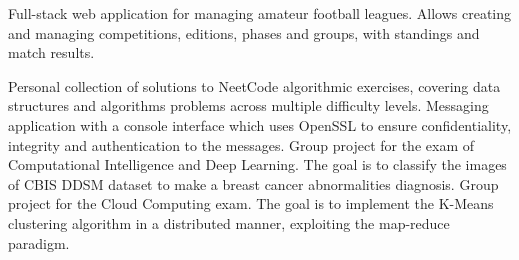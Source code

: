 
  {Full-stack web application for managing amateur football leagues. Allows creating and managing competitions, editions, phases and groups, with standings and match results.}
  {}
  {    }
\vspace{1mm}
\begin{tcbraster}[raster columns=2,raster equal height=rows,raster column skip=3mm,raster row skip=3mm]
  {Personal collection of solutions to NeetCode algorithmic exercises, covering data structures and algorithms problems across multiple difficulty levels.}
  {}
  {  }
  {Messaging application with a console interface which uses OpenSSL to ensure confidentiality, integrity and authentication to the messages.}
  { \quad {}}
  {   }
  {Group project for the exam of Computational Intelligence and Deep Learning. The goal is to classify the images of CBIS DDSM dataset to make a breast cancer abnormalities diagnosis.}
  {}
  {  }
  {Group project for the Cloud Computing exam. The goal is to implement the K-Means clustering algorithm in a distributed manner, exploiting the map-reduce paradigm.}
  {}
  {  }
\end{tcbraster}
